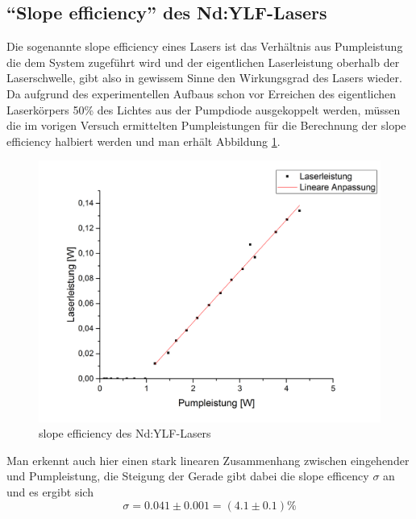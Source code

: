 \subsection{"`Slope efficiency"' des Nd:YLF-Lasers}
Die sogenannte slope efficiency eines Lasers ist das Verhältnis aus Pumpleistung die dem System zugeführt wird und der eigentlichen Laserleistung oberhalb der Laserschwelle, gibt also in gewissem Sinne den Wirkungsgrad des Lasers wieder. Da aufgrund des experimentellen Aufbaus schon vor Erreichen des eigentlichen Laserkörpers 50\% des Lichtes aus der Pumpdiode ausgekoppelt werden, müssen die im vorigen Versuch ermittelten Pumpleistungen für die Berechnung der slope efficiency halbiert werden und man erhält Abbildung \ref{slope}.
\begin{figure}[H]
	\begin{center}
		\includegraphics[scale=.5]{Bilder/slope.png}
		\caption{slope efficiency des Nd:YLF-Lasers}
		\label{slope}
	\end{center}
\end{figure}
Man erkennt auch hier einen stark linearen Zusammenhang zwischen eingehender und Pumpleistung, die Steigung der Gerade gibt dabei die slope efficency $\sigma$ an und es ergibt sich
\begin{equation}
\sigma=0.041\pm0.001=(4.1\pm0.1)\%
\end{equation}
